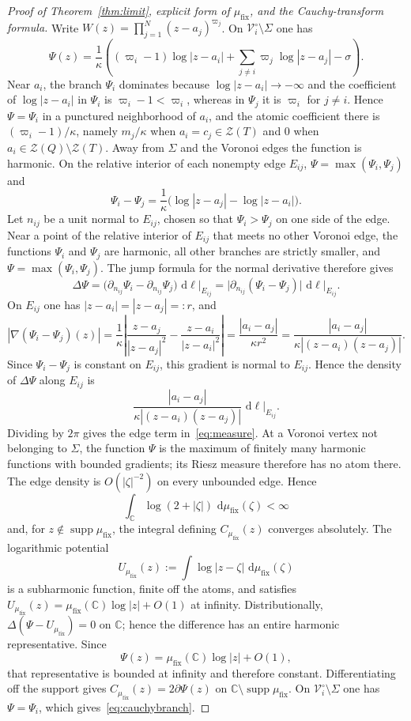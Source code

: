 \documentclass[reqno]{article}
\theoremstyle{definition}
\theoremstyle{remark}
\theoremstyle{plain}
\newcommand{\C}{\mathbb C}
\newcommand{\Z}{\mathcal Z}
\newcommand{\dd}{\,\mathrm d}
\begin{document}
\begin{proof}[Proof of Theorem~\ref{thm:limit}, explicit form of $\mu_{\mathrm{fix}}$, and the Cauchy-transform formula]
Write $W(z)=\prod_{j=1}^N(z-a_j)^{\varpi_j}$. On $\mathcal V_i^\circ\setminus\Sigma$ one has
$$\Psi(z)=\frac{1}{\kappa}\left((\varpi_i-1)\log|z-a_i|+\sum_{j\ne i}\varpi_j\log|z-a_j|-\sigma\right).$$
Near $a_i$, the branch $\Psi_i$ dominates because $\log|z-a_i|\to-\infty$ and the coefficient of $\log|z-a_i|$ in $\Psi_i$ is $\varpi_i-1<\varpi_i$, whereas in $\Psi_j$ it is $\varpi_i$ for $j\ne i$. Hence $\Psi=\Psi_i$ in a punctured neighborhood of $a_i$, and the atomic coefficient there is $(\varpi_i-1)/\kappa$, namely $m_j/\kappa$ when $a_i=c_j\in \Z(T)$ and $0$ when $a_i\in \Z(Q)\setminus \Z(T)$. Away from $\Sigma$ and the Voronoi edges the function is harmonic. On the relative interior of each nonempty edge $E_{ij}$, $\Psi=\max(\Psi_i,\Psi_j)$ and
$$\Psi_i-\Psi_j=\frac{1}{\kappa}\bigl(\log|z-a_j|-\log|z-a_i|\bigr).$$
Let $n_{ij}$ be a unit normal to $E_{ij}$, chosen so that $\Psi_i>\Psi_j$ on one side of the edge. Near a point of the relative interior of $E_{ij}$ that meets no other Voronoi edge, the functions $\Psi_i$ and $\Psi_j$ are harmonic, all other branches are strictly smaller, and $\Psi=\max(\Psi_i,\Psi_j)$. The jump formula for the normal derivative therefore gives
$$\Delta\Psi=\bigl(\partial_{n_{ij}}\Psi_i-\partial_{n_{ij}}\Psi_j\bigr)\,\dd\ell\big|_{E_{ij}}=\bigl|\partial_{n_{ij}}(\Psi_i-\Psi_j)\bigr|\,\dd\ell\big|_{E_{ij}}.$$
On $E_{ij}$ one has $|z-a_i|=|z-a_j|=:r$, and
$$|\nabla(\Psi_i-\Psi_j)(z)|=\frac{1}{\kappa}\left|\frac{z-a_j}{|z-a_j|^2}-\frac{z-a_i}{|z-a_i|^2}\right|=\frac{|a_i-a_j|}{\kappa r^2}=\frac{|a_i-a_j|}{\kappa |(z-a_i)(z-a_j)|}.$$
Since $\Psi_i-\Psi_j$ is constant on $E_{ij}$, this gradient is normal to $E_{ij}$. Hence the density of $\Delta\Psi$ along $E_{ij}$ is
$$\frac{|a_i-a_j|}{\kappa |(z-a_i)(z-a_j)|}\,\dd\ell\big|_{E_{ij}}.$$
Dividing by $2\pi$ gives the edge term in~\eqref{eq:measure}. At a Voronoi vertex not belonging to $\Sigma$, the function $\Psi$ is the maximum of finitely many harmonic functions with bounded gradients; its Riesz measure therefore has no atom there. The edge density is $O(|\zeta|^{-2})$ on every unbounded edge. Hence
\[
\int_{\C}\log(2+|\zeta|)\,\dd\mu_{\mathrm{fix}}(\zeta)<\infty
\]
and, for $z\notin\operatorname{supp}\mu_{\mathrm{fix}}$, the integral defining $C_{\mu_{\mathrm{fix}}}(z)$ converges absolutely. The logarithmic potential
$$U_{\mu_{\mathrm{fix}}}(z):=\int\log|z-\zeta|\,\dd\mu_{\mathrm{fix}}(\zeta)$$
is a subharmonic function, finite off the atoms, and satisfies $U_{\mu_{\mathrm{fix}}}(z)=\mu_{\mathrm{fix}}(\C)\log|z|+O(1)$ at infinity. Distributionally, $\Delta(\Psi-U_{\mu_{\mathrm{fix}}})=0$ on $\C$; hence the difference has an entire harmonic representative. Since
$$\Psi(z)=\mu_{\mathrm{fix}}(\C)\log|z|+O(1),$$
that representative is bounded at infinity and therefore constant. Differentiating off the support gives $C_{\mu_{\mathrm{fix}}}(z)=2\partial\Psi(z)$ on $\C\setminus\operatorname{supp}\mu_{\mathrm{fix}}$. On $\mathcal V_i^\circ\setminus\Sigma$ one has $\Psi=\Psi_i$, which gives~\eqref{eq:cauchybranch}.
\end{proof}
\end{document}
